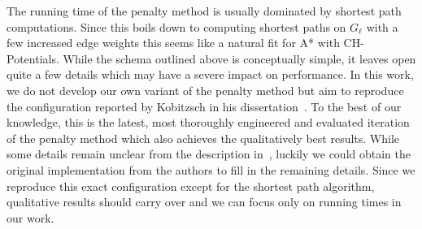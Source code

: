 \documentclass[manuscript,review]{acmart}
\begin{document}
The running time of the penalty method is usually dominated by shortest path computations.
Since this boils down to computing shortest paths on $G_{\ell}$ with a few increased edge weights this seems like a natural fit for A* with CH-Potentials.
While the schema outlined above is conceptually simple, it leaves open quite a few details which may have a severe impact on performance.
In this work, we do not develop our own variant of the penalty method but aim to reproduce the configuration reported by Kobitzsch in his dissertation~\cite{kobitzsch2015alternative}.
To the best of our knowledge, this is the latest, most thoroughly engineered and evaluated iteration of the penalty method which also achieves the qualitatively best results.
While some details remain unclear from the description in~\cite{kobitzsch2015alternative}, luckily we could obtain the original implementation from the authors to fill in the remaining details.
Since we reproduce this exact configuration except for the shortest path algorithm, qualitative results should carry over and we can focus only on running times in our work.
\end{document}

